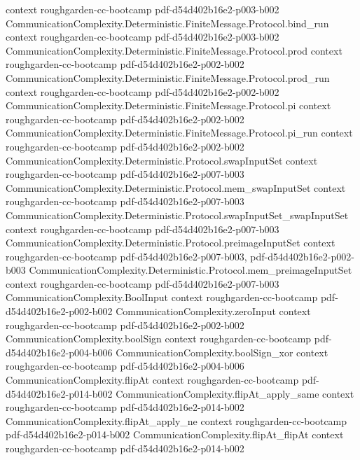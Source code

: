 \begin{theorem}
  {context}
  {roughgarden-cc-bootcamp}
  {pdf-d54d402b16e2-p003-b002}
\proofstep
  {CommunicationComplexity.Deterministic.FiniteMessage.Protocol.bind_run}
  {context}
  {roughgarden-cc-bootcamp}
  {pdf-d54d402b16e2-p003-b002}
\proofstep
  {CommunicationComplexity.Deterministic.FiniteMessage.Protocol.prod}
  {context}
  {roughgarden-cc-bootcamp}
  {pdf-d54d402b16e2-p002-b002}
\proofstep
  {CommunicationComplexity.Deterministic.FiniteMessage.Protocol.prod_run}
  {context}
  {roughgarden-cc-bootcamp}
  {pdf-d54d402b16e2-p002-b002}
\proofstep
  {CommunicationComplexity.Deterministic.FiniteMessage.Protocol.pi}
  {context}
  {roughgarden-cc-bootcamp}
  {pdf-d54d402b16e2-p002-b002}
\proofstep
  {CommunicationComplexity.Deterministic.FiniteMessage.Protocol.pi_run}
  {context}
  {roughgarden-cc-bootcamp}
  {pdf-d54d402b16e2-p002-b002}
\proofstep
  {CommunicationComplexity.Deterministic.Protocol.swapInputSet}
  {context}
  {roughgarden-cc-bootcamp}
  {pdf-d54d402b16e2-p007-b003}
\proofstep
  {CommunicationComplexity.Deterministic.Protocol.mem_swapInputSet}
  {context}
  {roughgarden-cc-bootcamp}
  {pdf-d54d402b16e2-p007-b003}
\proofstep
  {CommunicationComplexity.Deterministic.Protocol.swapInputSet_swapInputSet}
  {context}
  {roughgarden-cc-bootcamp}
  {pdf-d54d402b16e2-p007-b003}
\proofstep
  {CommunicationComplexity.Deterministic.Protocol.preimageInputSet}
  {context}
  {roughgarden-cc-bootcamp}
  {pdf-d54d402b16e2-p007-b003,
    pdf-d54d402b16e2-p002-b003}
\proofstep
  {CommunicationComplexity.Deterministic.Protocol.mem_preimageInputSet}
  {context}
  {roughgarden-cc-bootcamp}
  {pdf-d54d402b16e2-p007-b003}
\proofstep
  {CommunicationComplexity.BoolInput}
  {context}
  {roughgarden-cc-bootcamp}
  {pdf-d54d402b16e2-p002-b002}
\proofstep
  {CommunicationComplexity.zeroInput}
  {context}
  {roughgarden-cc-bootcamp}
  {pdf-d54d402b16e2-p002-b002}
\proofstep
  {CommunicationComplexity.boolSign}
  {context}
  {roughgarden-cc-bootcamp}
  {pdf-d54d402b16e2-p004-b006}
\proofstep
  {CommunicationComplexity.boolSign_xor}
  {context}
  {roughgarden-cc-bootcamp}
  {pdf-d54d402b16e2-p004-b006}
\proofstep
  {CommunicationComplexity.flipAt}
  {context}
  {roughgarden-cc-bootcamp}
  {pdf-d54d402b16e2-p014-b002}
\proofstep
  {CommunicationComplexity.flipAt_apply_same}
  {context}
  {roughgarden-cc-bootcamp}
  {pdf-d54d402b16e2-p014-b002}
\proofstep
  {CommunicationComplexity.flipAt_apply_ne}
  {context}
  {roughgarden-cc-bootcamp}
  {pdf-d54d402b16e2-p014-b002}
\proofstep
  {CommunicationComplexity.flipAt_flipAt}
  {context}
  {roughgarden-cc-bootcamp}
  {pdf-d54d402b16e2-p014-b002}

\end{theorem}
